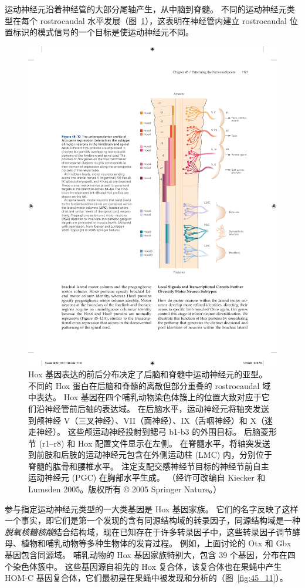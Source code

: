 运动神经元沿着神经管的大部分尾轴产生，从中脑到脊髓。
不同的运动神经元类型在每个 rostrocaudal 水平发展（图~\ref{fig:45_10}），这表明在神经管内建立 rostrocaudal 位置标识的模式信号的一个目标是使运动神经元不同。


\begin{figure}[htbp]
	\centering
	\includegraphics[width=0.65\linewidth]{chap45/fig_45_10}
	\caption{Hox 基因表达的前后分布决定了后脑和脊髓中运动神经元的亚型。 不同的 Hox 蛋白在后脑和脊髓的离散但部分重叠的 rostrocaudal 域中表达。 Hox 基因在四个哺乳动物染色体簇上的位置大致对应于它们沿神经管前后轴的表达域。 在后脑水平，运动神经元将轴突发送到颅神经 V（三叉神经）、VII（面神经）、IX（舌咽神经）和 X（迷走神经）。 这些颅运动神经投射到鳃弓 b1-b3 的外围目标。 后脑菱形节 (r1–r8) 和 Hox 配置文件显示在左侧。 在脊髓水平，将轴突发送到前肢和后肢的运动神经元包含在外侧运动柱 (LMC) 内，分别位于脊髓的肱骨和腰椎水平。 注定支配交感神经节目标的神经节前自主运动神经元 (PGC) 在胸部水平生成。 （经许可改编自 Kiecker 和 Lumsden 2005。版权所有 © 2005 Springer Nature。）}
	\label{fig:45_10}
\end{figure}


参与指定运动神经元类型的一大类基因是 Hox 基因家族。
它们的名字反映了这样一个事实，即它们是第一个发现的含有同源结构域的转录因子，同源结构域是一种\textit{脱氧核糖核酸}结合结构域，现在已知存在于许多转录因子中，这些转录因子调节酵母、植物和哺乳动物等多种生物体的发育过程。
例如，上面讨论的 Otx 和 Gbx 基因包含同源域。
哺乳动物的 Hox 基因家族特别大，包含 39 个基因，分布在四个染色体簇中。
这些基因源自祖先的 Hox 复合体，该复合体也在果蝇中产生 HOM-C 基因复合体，它们最初是在果蝇中被发现和分析的（图~\ref{fig:45_11}）。


